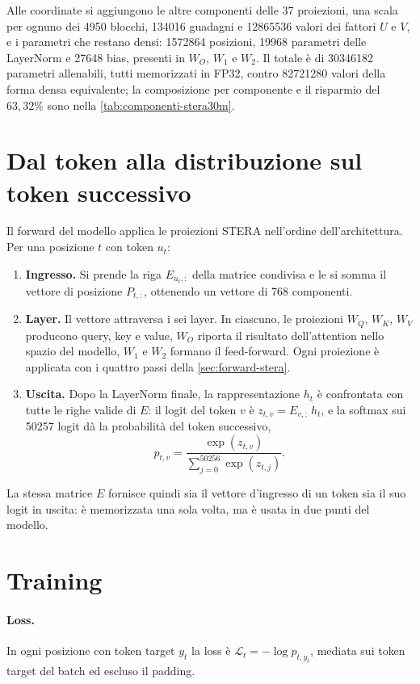 Alle coordinate si aggiungono le altre componenti delle 37 proiezioni, una scala per ognuno dei \num{4950} blocchi, \num{134016} guadagni e \num{12865536} valori dei fattori $U$ e $V$, e i parametri che restano densi: \num{1572864} posizioni, \num{19968} parametri delle LayerNorm e \num{27648} bias, presenti in $W_O$, $W_1$ e $W_2$. Il totale è di \num{30346182} parametri allenabili, tutti memorizzati in FP32, contro \num{82721280} valori della forma densa equivalente; la composizione per componente e il risparmio del $63{,}32\%$ sono nella \autoref{tab:componenti-stera30m}.

\section{Dal token alla distribuzione sul token successivo}
\label{sec:percorso-token}

Il forward del modello applica le proiezioni STERA nell'ordine dell'architettura. Per una posizione $t$ con token $u_t$:
\begin{enumerate}
\item \textbf{Ingresso.} Si prende la riga $E_{u_t,:}$ della matrice condivisa e le si somma il vettore di posizione $P_{t,:}$, ottenendo un vettore di 768 componenti.
\item \textbf{Layer.} Il vettore attraversa i sei layer. In ciascuno, le proiezioni $W_Q$, $W_K$, $W_V$ producono query, key e value, $W_O$ riporta il risultato dell'attention nello spazio del modello, $W_1$ e $W_2$ formano il feed-forward. Ogni proiezione è applicata con i quattro passi della \autoref{sec:forward-stera}.
\item \textbf{Uscita.} Dopo la LayerNorm finale, la rappresentazione $h_t$ è confrontata con tutte le righe valide di $E$: il logit del token $v$ è $z_{t,v}=E_{v,:}\,h_t$, e la softmax sui \num{50257} logit dà la probabilità del token successivo,
\[
p_{t,v}=\frac{\exp(z_{t,v})}{\sum_{j=0}^{50256}\exp(z_{t,j})}.
\]
\end{enumerate}
La stessa matrice $E$ fornisce quindi sia il vettore d'ingresso di un token sia il suo logit in uscita: è memorizzata una sola volta, ma è usata in due punti del modello.

\section{Training}
\label{sec:addestramento-stera30m}

\paragraph{Loss.} In ogni posizione con token target $y_t$ la loss è $\mathcal L_t=-\log p_{t,y_t}$, mediata sui token target del batch ed escluso il padding.


